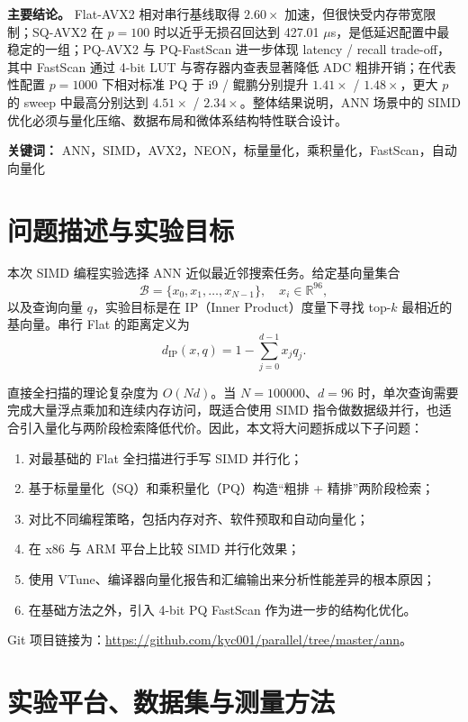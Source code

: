\documentclass[a4paper,11pt,UTF8]{ctexart}
\begin{document}
\noindent\textbf{主要结论。} Flat-AVX2 相对串行基线取得 $2.60\times$ 加速，但很快受内存带宽限制；SQ-AVX2 在 $p=100$ 时以近乎无损召回达到 427.01 $\mu$s，是低延迟配置中最稳定的一组；PQ-AVX2 与 PQ-FastScan 进一步体现 latency / recall trade-off，其中 FastScan 通过 4-bit LUT 与寄存器内查表显著降低 ADC 粗排开销；在代表性配置 $p=1000$ 下相对标准 PQ 于 i9 / 鲲鹏分别提升 $1.41\times$ / $1.48\times$，更大 $p$ 的 sweep 中最高分别达到 $4.51\times$ / $2.34\times$。整体结果说明，ANN 场景中的 SIMD 优化必须与量化压缩、数据布局和微体系结构特性联合设计。

\noindent\textbf{关键词：} ANN，SIMD，AVX2，NEON，标量量化，乘积量化，FastScan，自动向量化

\section{问题描述与实验目标}

本次 SIMD 编程实验选择 ANN 近似最近邻搜索任务。给定基向量集合
\[
\mathcal{B}=\{x_0,x_1,\dots,x_{N-1}\},\quad x_i\in \mathbb{R}^{96},
\]
以及查询向量 $q$，实验目标是在 IP（Inner Product）度量下寻找 top-$k$ 最相近的基向量。串行 Flat 的距离定义为
\[
d_{\mathrm{IP}}(x,q)=1-\sum_{j=0}^{d-1}x_jq_j.
\]

直接全扫描的理论复杂度为 $O(Nd)$。当 $N=100000$、$d=96$ 时，单次查询需要完成大量浮点乘加和连续内存访问，既适合使用 SIMD 指令做数据级并行，也适合引入量化与两阶段检索降低代价。因此，本文将大问题拆成以下子问题：
\begin{enumerate}
  \item 对最基础的 Flat 全扫描进行手写 SIMD 并行化；
  \item 基于标量量化（SQ）和乘积量化（PQ）构造``粗排 + 精排''两阶段检索；
  \item 对比不同编程策略，包括内存对齐、软件预取和自动向量化；
  \item 在 x86 与 ARM 平台上比较 SIMD 并行化效果；
  \item 使用 VTune、编译器向量化报告和汇编输出来分析性能差异的根本原因；
  \item 在基础方法之外，引入 4-bit PQ FastScan 作为进一步的结构化优化。
\end{enumerate}

Git 项目链接为：\url{https://github.com/kyc001/parallel/tree/master/ann}。

\section{实验平台、数据集与测量方法}
\end{document}
